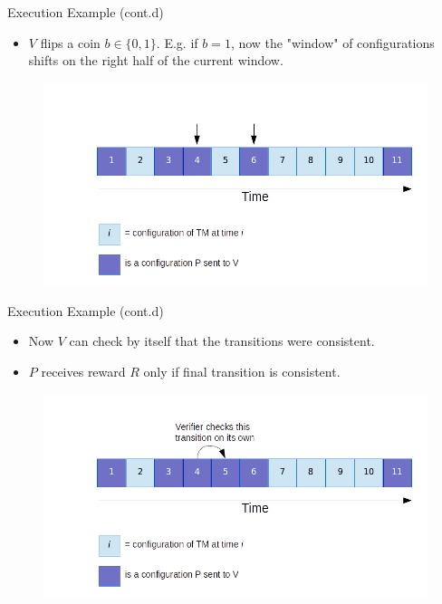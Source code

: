 \begin{frame}{Execution Example (cont.d)}
	\begin{itemize}
		\item $V$ flips a coin $b \in \{ 0,1 \}$. E.g. if $b = 1$, now the "window" of configurations shifts on the right half of the current window.
	\end{itemize}
	\begin{figure}
		\includegraphics[scale=0.4]{pics/r3bis.png}
	\end{figure}
\end{frame}


\begin{frame}{Execution Example (cont.d)}
	\begin{itemize}
		\item Now $V$ can check by itself that the transitions were consistent.
		\item $P$ receives reward $R$ only if final transition is consistent.
	\end{itemize}
	\begin{figure}
		\includegraphics[scale=0.4]{pics/r-final.png}
	\end{figure}
\end{frame}



